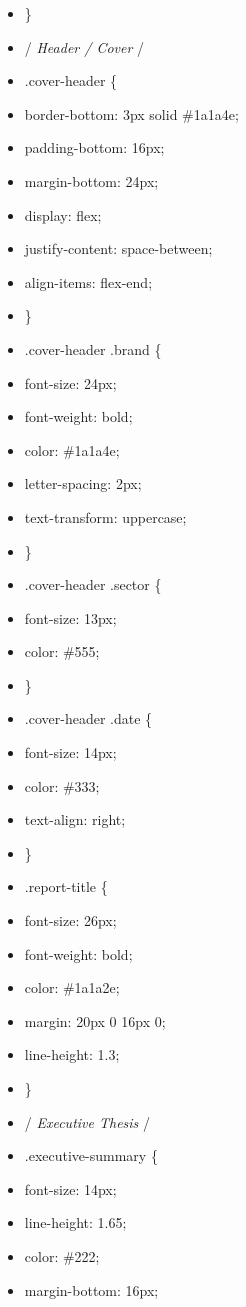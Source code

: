 \documentclass[11pt]{article}
\begin{document}
\begin{itemize}[leftmargin=*,itemsep=2pt,topsep=2pt]
\item {} \}
\item {} /\emph{ Header / Cover }/
\item {} .cover-header \{
\item {} border-bottom: 3px solid \#1a1a4e;
\item {} padding-bottom: 16px;
\item {} margin-bottom: 24px;
\item {} display: flex;
\item {} justify-content: space-between;
\item {} align-items: flex-end;
\item {} \}
\item {} .cover-header .brand \{
\item {} font-size: 24px;
\item {} font-weight: bold;
\item {} color: \#1a1a4e;
\item {} letter-spacing: 2px;
\item {} text-transform: uppercase;
\item {} \}
\item {} .cover-header .sector \{
\item {} font-size: 13px;
\item {} color: \#555;
\item {} \}
\item {} .cover-header .date \{
\item {} font-size: 14px;
\item {} color: \#333;
\item {} text-align: right;
\item {} \}
\item {} .report-title \{
\item {} font-size: 26px;
\item {} font-weight: bold;
\item {} color: \#1a1a2e;
\item {} margin: 20px 0 16px 0;
\item {} line-height: 1.3;
\item {} \}
\item {} /\emph{ Executive Thesis }/
\item {} .executive-summary \{
\item {} font-size: 14px;
\item {} line-height: 1.65;
\item {} color: \#222;
\item {} margin-bottom: 16px;

\end{itemize}
\end{document}
